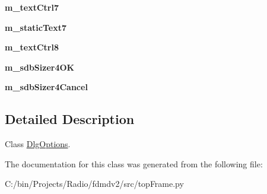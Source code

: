 \begin{DoxyCompactItemize}
\item 
\hypertarget{classtop_frame_1_1_dlg_options_ac133ff4700bf43d396b4d03e8984cc07}{{\bfseries m\-\_\-text\-Ctrl7}}\label{classtop_frame_1_1_dlg_options_ac133ff4700bf43d396b4d03e8984cc07}

\item 
\hypertarget{classtop_frame_1_1_dlg_options_a616709942883690ba5867e5a4e4d6189}{{\bfseries m\-\_\-static\-Text7}}\label{classtop_frame_1_1_dlg_options_a616709942883690ba5867e5a4e4d6189}

\item 
\hypertarget{classtop_frame_1_1_dlg_options_a7a32f2e9f938dc99f9162597b439ae13}{{\bfseries m\-\_\-text\-Ctrl8}}\label{classtop_frame_1_1_dlg_options_a7a32f2e9f938dc99f9162597b439ae13}

\item 
\hypertarget{classtop_frame_1_1_dlg_options_ac5fe8380ae73901f5161860e090e6faf}{{\bfseries m\-\_\-sdb\-Sizer4\-O\-K}}\label{classtop_frame_1_1_dlg_options_ac5fe8380ae73901f5161860e090e6faf}

\item 
\hypertarget{classtop_frame_1_1_dlg_options_aa82caef9581486ce3114491843d7a4fe}{{\bfseries m\-\_\-sdb\-Sizer4\-Cancel}}\label{classtop_frame_1_1_dlg_options_aa82caef9581486ce3114491843d7a4fe}

\end{DoxyCompactItemize}


\subsection{Detailed Description}
Class \hyperlink{classtop_frame_1_1_dlg_options}{Dlg\-Options}. 

The documentation for this class was generated from the following file\-:\begin{DoxyCompactItemize}
\item 
C\-:/bin/\-Projects/\-Radio/fdmdv2/src/top\-Frame.\-py\end{DoxyCompactItemize}
